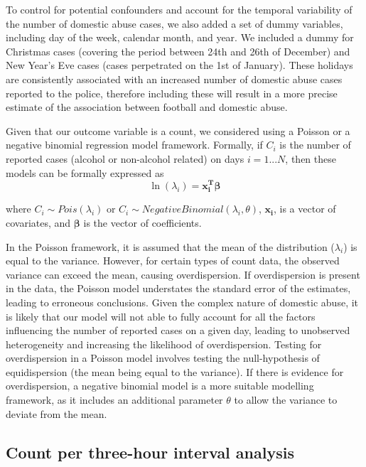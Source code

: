 \documentclass[12pt, a4paper]{article}
\newcommand{\vect}[1]{\boldsymbol{#1}}
\begin{document}
To control for potential confounders and account for the temporal variability of the number of domestic abuse cases, we also added a set of dummy  variables, including day of the week, calendar month, and year. 
We included a dummy for Christmas cases (covering the period between 24th and 26th of December) and New Year's Eve cases (cases perpetrated on the 1st of January). 
These holidays are consistently associated with an increased number of domestic abuse cases reported to the police, therefore including these will result in a more precise estimate of the association between football and domestic abuse.

Given that our outcome variable is a count, we considered using a Poisson or a negative binomial regression model framework. 
Formally, if $C_i$ is the number of reported cases (alcohol or non-alcohol related) on days $i = 1...N$, then these models can be formally expressed as
%
\begin{equation}
 \ln(\lambda_i) =\vect{x_i^{T}}\vect{\beta}
\end{equation}


where 
$C_i \sim Pois(\lambda_i)$ or $C_i \sim Negative Binomial(\lambda_i,\theta)$, $\vect{x_i}$, is a vector of covariates, and $\boldsymbol{\beta}$ is the vector of coefficients.

In the Poisson framework, it is assumed that the mean of the distribution ($\lambda_i$) is equal to the variance. 
However, for certain types of count data, the observed variance can exceed the mean, causing overdispersion. 
If overdispersion is present in the data, the Poisson model understates the standard error of the estimates, leading to erroneous conclusions. 
Given the complex nature of domestic abuse, it is likely that our model will not able to fully account for all the factors influencing the number of reported cases on a given day, leading to unobserved heterogeneity and increasing the likelihood of overdispersion. 
Testing for overdispersion in a Poisson model involves testing the null-hypothesis of equidispersion (the mean being equal to the variance).
If there is evidence for overdispersion, a negative binomial model is a more suitable modelling framework, as it includes an additional parameter $\theta$ to allow the variance to deviate from the mean. 


\subsection{Count per three-hour interval analysis}
\end{document}
